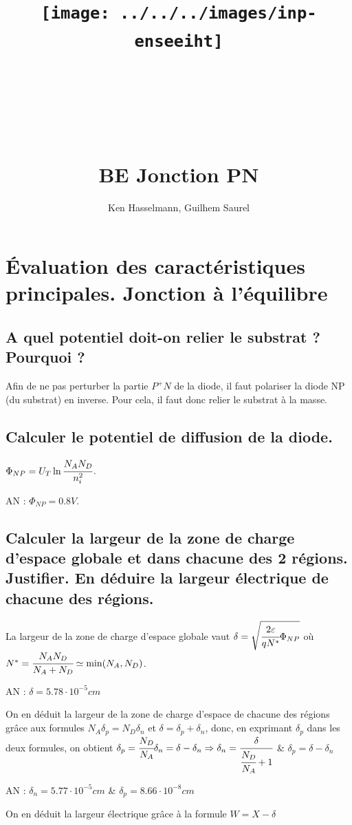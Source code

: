\documentclass[10pt]{article}
\title{\texttt{[image: ../../../images/inp-enseeiht]} \\ ~ \\ ~ \\ ~ \\ ~ \\ BE Jonction PN}
\author{Ken Hasselmann, Guilhem Saurel}
\date{\oldstylenums{\today}}
\begin{document}
 \begin{titlepage}
  \maketitle
  \tableofcontents
 \end{titlepage}

 \section{Évaluation des caractéristiques principales. Jonction à l'équilibre}
  \subsection{A quel potentiel doit-on relier le substrat ? Pourquoi ?}
   Afin de ne pas perturber la partie $P^+N$ de la diode, il faut polariser la diode NP (du substrat) en inverse. Pour cela, il faut donc relier le substrat à la masse.

  \subsection{Calculer le potentiel de diffusion de la diode.}
   $\Phi_{NP} = U_T \ln\cfrac{N_A N_D}{n_i^2}$.
   
   AN : $\Phi_{NP} = 0.8V$.

  \subsection{Calculer la largeur de la zone de charge d’espace globale et dans chacune des 2 régions. Justifier. En déduire la largeur électrique de chacune des régions.} 
   La largeur de la zone de charge d'espace globale vaut $\delta = \sqrt{\cfrac{2\varepsilon}{qN^\ast}\Phi_{NP}}$ où $N^\ast = \cfrac{N_A N_D}{N_A + N_D} \simeq \min(N_A,N_D)$. 
   
   AN : $\delta = 5.78\cdot 10^{-5}cm$

   On en déduit la largeur de la zone de charge d'espace de chacune des régions grâce aux formules $N_A \delta_p = N_D \delta_n$ et $\delta = \delta_p + \delta_n$, donc, en exprimant $\delta_p$ dans les deux formules, on obtient $\delta_p = \cfrac{N_D}{N_A}\delta_n = \delta - \delta_n \Rightarrow \delta_n =\cfrac{\delta}{\cfrac{N_D}{N_A} +1}$ \& $\delta_p = \delta - \delta_n$

   AN : $\delta_n = 5.77\cdot 10^{-5} cm$ \& $\delta_p = 8.66\cdot 10^{-8}cm$

   On en déduit la largeur électrique grâce à la formule $W = X - \delta$
\end{document}
